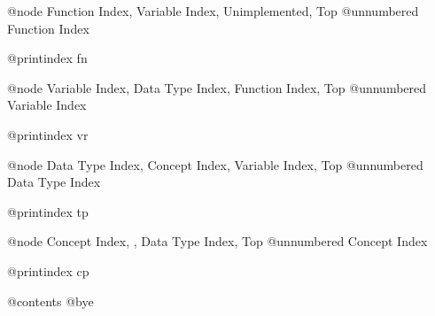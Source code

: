 @node Function Index, Variable Index, Unimplemented, Top
@unnumbered Function Index

@printindex fn

@node Variable Index, Data Type Index, Function Index, Top
@unnumbered Variable Index

@printindex vr

@node Data Type Index, Concept Index, Variable Index, Top
@unnumbered Data Type Index

@printindex tp

@node Concept Index, , Data Type Index, Top
@unnumbered Concept Index

@printindex cp

@contents
@bye


